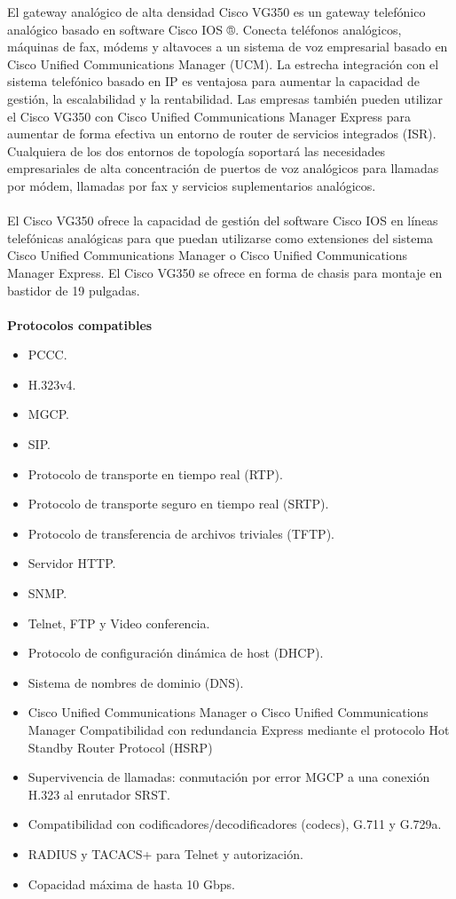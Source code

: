 \documentclass[12pt,letterpaper]{article}
\begin{document}
El gateway analógico de alta densidad Cisco VG350 es un gateway telefónico analógico 
basado en software Cisco IOS ®. Conecta teléfonos analógicos, máquinas de fax, módems y 
altavoces a un sistema de voz empresarial basado en Cisco Unified Communications Manager 
(UCM). La estrecha integración con el sistema telefónico basado en IP es ventajosa para 
aumentar la capacidad de gestión, la escalabilidad y la rentabilidad. Las empresas también 
pueden utilizar el Cisco VG350 con Cisco Unified Communications Manager Express para 
aumentar de forma efectiva un entorno de router de servicios integrados (ISR). 
Cualquiera de los dos entornos de topología soportará las necesidades empresariales de 
alta concentración de puertos de voz analógicos para llamadas por módem, llamadas por 
fax y servicios suplementarios analógicos.
\\ \\
El Cisco VG350 ofrece la capacidad de gestión del software Cisco IOS en líneas telefónicas 
analógicas para que puedan utilizarse como extensiones del sistema Cisco Unified 
Communications Manager o Cisco Unified Communications Manager Express. El Cisco VG350 
se ofrece en forma de chasis para montaje en bastidor de 19 pulgadas. \cite{gateways}
\\ \\
\textbf{Protocolos compatibles}
\begin{itemize} 
    \item PCCC.
    \item H.323v4.
    \item MGCP.
    \item SIP.
    \item Protocolo de transporte en tiempo real (RTP).
    \item Protocolo de transporte seguro en tiempo real (SRTP).
    \item Protocolo de transferencia de archivos triviales (TFTP).
    \item Servidor HTTP.
    \item SNMP.
    \item Telnet, FTP y Video conferencia.
    \item Protocolo de configuración dinámica de host (DHCP).
    \item Sistema de nombres de dominio (DNS).
    \item Cisco Unified Communications Manager o Cisco Unified 
    Communications Manager Compatibilidad con redundancia Express 
    mediante el protocolo Hot Standby Router Protocol (HSRP)
    \item Supervivencia de llamadas: conmutación por error MGCP 
    a una conexión H.323 al enrutador SRST.
    \item Compatibilidad con codificadores/decodificadores (codecs), G.711 y G.729a.
    \item RADIUS y TACACS+ para Telnet y autorización.
    \item Copacidad máxima de hasta 10 Gbps.
\end{itemize}
\end{document}
